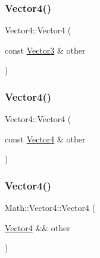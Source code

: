 \mbox{\label{struct_math_1_1_vector4_ab90ed6d952a51d132574f5459f2d43d4}} 
\subsubsection{\texorpdfstring{Vector4()}{Vector4()}\hspace{0.1cm}{\footnotesize\ttfamily [3/5]}}
{\footnotesize\ttfamily Vector4\+::\+Vector4 (\begin{DoxyParamCaption}\item[{const \mbox{\hyperlink{struct_math_1_1_vector3}{Vector3}} \&}]{other }\end{DoxyParamCaption})}

\mbox{\label{struct_math_1_1_vector4_a5e32a459d47c732d9218a7967327007b}} 
\subsubsection{\texorpdfstring{Vector4()}{Vector4()}\hspace{0.1cm}{\footnotesize\ttfamily [4/5]}}
{\footnotesize\ttfamily Vector4\+::\+Vector4 (\begin{DoxyParamCaption}\item[{const \mbox{\hyperlink{struct_math_1_1_vector4}{Vector4}} \&}]{other }\end{DoxyParamCaption})}

\mbox{\label{struct_math_1_1_vector4_a40bedb7beb32ba948ceb5c83d94e07c8}} 
\subsubsection{\texorpdfstring{Vector4()}{Vector4()}\hspace{0.1cm}{\footnotesize\ttfamily [5/5]}}
{\footnotesize\ttfamily Math\+::\+Vector4\+::\+Vector4 (\begin{DoxyParamCaption}\item[{\mbox{\hyperlink{struct_math_1_1_vector4}{Vector4}} \&\&}]{other }\end{DoxyParamCaption})}



